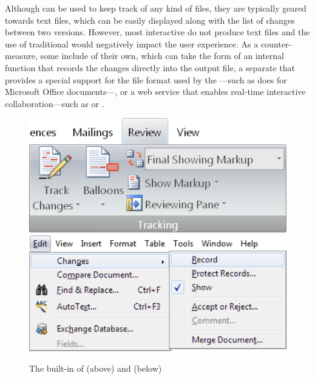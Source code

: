 \documentclass[
  a5paper,10pt,           %
  dvipsnames              %
]{book}
\begin{document}
\begin{figure}[!b]
  
\end{figure}

\begin{figure}
  
\end{figure}

\begin{figure}
  
\end{figure}

Although  can be used to keep track of any kind of files, they are
typically geared towards text files, which can be easily displayed along with
the list of changes between two versions. However, most interactive 
do not produce text files and the use of traditional  would
negatively impact the user experience. As a counter-measure, some 
include  of their own, which can take the form of an internal
function that records the changes directly into the output file, a separate
 that provides a special support for the file format used by the
---such as  does for Microsoft Office
documents---, or a web service that enables real-time interactive
collaboration---such as  or .

\begin{figure}
  \includegraphics[width=\textwidth]{examples/01/word.png}\nextimage
  \includegraphics[width=\textwidth]{examples/01/openoffice.png}
  \caption{The built-in  of  (above) and
     (below)}
\end{figure}
\end{document}
